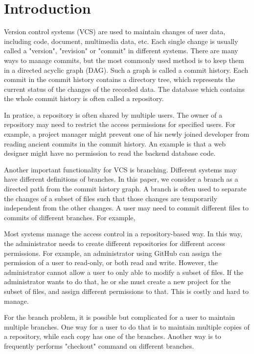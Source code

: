 \section{Introduction}
\label{s:intro}

Version control systems (VCS) are used to maintain changes of user data,
including code, document, multimedia data, etc. Each single
change is usually called a "version", "revision" or "commit" in different
systems. There are many ways to manage commits, but the most commonly used
method is to keep them in a directed acyclic graph (DAG). Such a graph is called
a commit history. Each commit in the commit history contains a directory tree,
which represents the current status of the changes of the recorded data. The
database which contains the whole commit history is often called a repository.

In pratice, a repository is often shared by multiple users. The owner of a
repository may need to restrict the access permissions for specified users. For
example, a project manager might prevent one of his newly joined developer from
reading ancient commits in the commit history. An example is that a web designer
might have no permission to read the backend database code.

Another important functionality for VCS is branching. Different systems may have
different definitions of branches. In this paper, we consider a branch as a
directed path from the commit history graph. A branch is often used to separate
the changes of a subset of files such that those changes are temporarily
independent from the other changes. A user may need to commit different files to commits of different
branches. For example, 

Most systems manage the access control in a repository-based way. In this way,
the administrator needs to create different repositories for different access
permissions. For example, an administrator using GitHub\cite{github} can assign
the permission of a user to read-only, or both read and write. However, the
administrator cannot allow a user to only able to modify a subset of files. If
the administrator wants to do that, he or she must create a new project for the
subset of files, and assign different permissions to that. This is costly and
hard to manage.

For the branch problem, it is possible but complicated for a user to maintain
multiple branches. One way for a user to do that is to maintain multiple copies
of a repository, while each copy has one of the branches. Another way is to
frequently performs "checkout" command on different branches.


